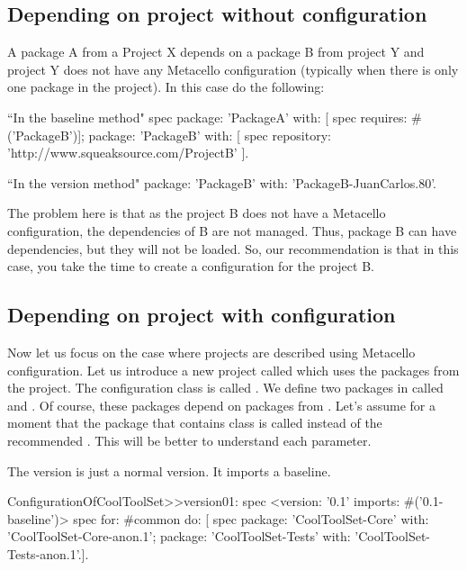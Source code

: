 \documentclass[a4paper,10pt,twoside]{book}
\begin{document}
\subsection{Depending on project without configuration}

A package A from a Project X depends on a package B from project Y and project Y does not have any Metacello configuration (typically when there is only one package in the project). In this case do the following:
\begin{code}{}
		``In the baseline method"
		spec 
			package: 'PackageA' with: [  spec requires: #('PackageB')];
			package: 'PackageB' with: [  spec repository: 'http://www.squeaksource.com/ProjectB' ].	
\end{code}

\begin{code}{}
		``In the version method"
		package: 'PackageB' with: 'PackageB-JuanCarlos.80'.
\end{code}

The problem here is that as the project B does not have a Metacello configuration, the dependencies of B are not managed. Thus, package B can have dependencies, but they will not be loaded. So, our recommendation is that in this case, you take the time to create a configuration for the project B.

\subsection{Depending on project with configuration}
Now let us focus on the case where projects are described using Metacello configuration.
Let us introduce a new project called  which uses the packages from the  project. The configuration class is called . We define two packages in  called  and . Of course, these packages depend on packages from . Let's assume for a moment that the package that contains  class is called  instead of the recommended . This will be better to understand each parameter. 


The version is just a normal version. It imports a baseline. 
\begin{code}{}
ConfigurationOfCoolToolSet>>version01: spec 
	<version: '0.1' imports: #('0.1-baseline')>
	spec for: #common do: [
		spec 
			package: 'CoolToolSet-Core' with: 'CoolToolSet-Core-anon.1';
			package: 'CoolToolSet-Tests' with: 'CoolToolSet-Tests-anon.1'.].	
\end{code}	
\end{document}
